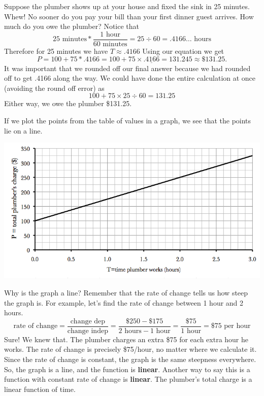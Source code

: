 Suppose the plumber shows up at your house and fixed the sink in 25 minutes.  Whew!  No sooner do you pay your bill than your first dinner guest arrives.  How much do you owe the plumber?  Notice that 
$$25 \text{ minutes} \ast \frac{1 \text{ hour}}{60 \text{ minutes}} = 25 \div 60 = .4166\ldots \text{ hours}$$  
Therefore for 25 minutes we have $T \approx .4166$  
Using our equation we get $$ P = 100 + 75\ast .4166 = 100 + 75 \times \underline{.4166} = 131.245 \approx \$131.25.$$  It was important that we rounded off our final answer because we had rounded off to get .4166 along the way.  We could have done the entire calculation at once (avoiding the round off error) as 
$$100 + 75 \times 25 \div 60 =131.25$$
Either way, we owe the plumber \$131.25.


If we plot the points from the table of values in a graph, we see that the points lie on a line.  
\begin{center}
 {\includegraphics [width = 6in] {Plumber.png}}
\end{center}
Why is the graph a line?  Remember that the rate of change tells us how steep the graph is.  For example, let's find the rate of change between 1 hour and 2 hours.
$$\text{rate of change} = \frac{\text{change dep}}{\text{change indep}} = \frac{\$250 - \$175}{2 \text{ hours} - 1 \text{ hour}} = \frac{\$75}{1 \text{ hour}} = \$75 \text{ per hour}$$  
Sure!  We knew that.  The plumber charges an extra \$75 for each extra hour he works.  The rate of change is precisely \$75/hour, no matter where we calculate it.  Since the rate of change is constant, the graph is the same steepness everywhere.  So, the graph is a line, and the function is \textbf{linear}.  Another way to say this is a function with constant rate of change is \textbf{linear}.  The plumber's total charge is a linear function of time.

